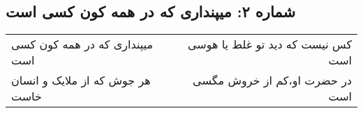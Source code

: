 \begin{center}
\section*{شماره ۲: میپنداری که در همه کون کسی است}
\label{sec:002}
\begin{longtable}{l p{0.5cm} r}
میپنداری که در همه کون کسی است
&&
کس نیست که دید تو غلط یا هوسی است
\\
هر جوش که از ملایک و انسان خاست
&&
در حضرت او،‌کم از خروش مگسی است
\\
\end{longtable}
\end{center}
